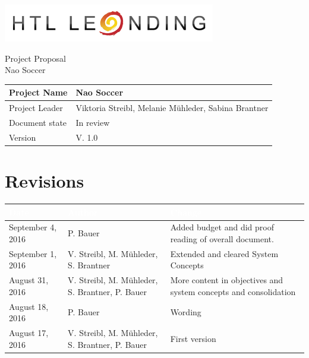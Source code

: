 \documentclass[12pt]{article}
\theoremstyle{definition}
\newcommand{\projectname}{Nao Soccer}
\newcommand{\productname}{Nao Soccer}
\newcommand{\projectleader}{Viktoria Streibl, Melanie Mühleder, Sabina Brantner}
\newcommand{\documentstatus}{In review}
\newcommand{\version}{V. 1.0}
\begin{document}
\begin{titlepage}
\begin{flushright}
\includegraphics[scale=.5]{htlleondinglogo.png}\\
\end{flushright}

\vspace{10em}

\begin{center}
{\Huge Project Proposal} \\[3em]
{\LARGE \productname} \\[3em]
\end{center}

\begin{flushleft}
\begin{tabular}{|l|l|}
\hline
Project Name & \projectname \\ \hline
Project Leader & \projectleader \\ \hline
Document state & \documentstatus \\ \hline
Version & \version \\ \hline
\end{tabular}
\end{flushleft}

\end{titlepage}
\section*{Revisions}
\begin{tabular}{|p{.25\linewidth}|p{.3\linewidth}|p{.37\linewidth}|}
\hline
\cellcolor[gray]{0.5}\textcolor{white}{Date} & \cellcolor[gray]{0.45}\textcolor{white}{Author} & \cellcolor[gray]{0.5}\textcolor{white}{Change} \\ \hline
September 4, 2016&P. Bauer&Added budget and did proof reading of overall document. \\ \hline
September 1, 2016&V. Streibl, M. Mühleder, S. Brantner&Extended and cleared System Concepts \\ \hline
August 31, 2016&V. Streibl, M. Mühleder, S. Brantner, P. Bauer&More content in objectives and system concepts and consolidation \\ \hline
August 18, 2016&P. Bauer&Wording \\ \hline
August 17, 2016&V. Streibl, M. Mühleder, S. Brantner, P. Bauer&First version \\ \hline
\end{tabular}
\pagebreak
\end{document}
